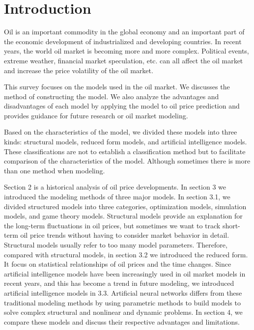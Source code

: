 \chapter{Introduction}
Oil is an important commodity in the global economy and an important part of the economic development of industrialized and developing countries. In recent years, the world oil market is becoming more and more complex. Political events, extreme weather, financial market speculation, etc. can all affect the oil market and increase the price volatility of the oil market.

This survey focuses on the models used in the oil market. We discusses the method of constructing the model. We also analyze the advantages and disadvantages of each model by applying the model to oil price prediction and provides guidance for future research or oil market modeling.


Based on the characteristics of the model, we divided these models into three kinds: structural models, reduced form models, and artificial intelligence models. These classifications are not to establish a classification method but to facilitate comparison of the characteristics of the model. Although sometimes there is more than one method when modeling.

Section 2 is a historical analysis of oil price developments. In section 3 we introduced the modeling methods of three major models. In section 3.1, we divided structured models into three categories, optimization models, simulation models, and game theory models. Structural models provide an explanation for the long-term fluctuations in oil prices, but sometimes we want to track short-term oil price trends without having to consider market behavior in detail. Structural models usually refer to too many model parameters. Therefore, compared with structural models, in section 3.2 we introduced the reduced form. It focus on statistical relationships of oil prices and the time changes. Since artificial intelligence models have been increasingly used in oil market models in recent years, and this has become a trend in future modeling, we introduced artificial intelligence models in 3.3. Artificial neural networks differs from these traditional modeling methods by using parametric methods to build models to solve complex structural and nonlinear and dynamic problems. In section 4, we compare these models and discuss their respective advantages and limitations.


